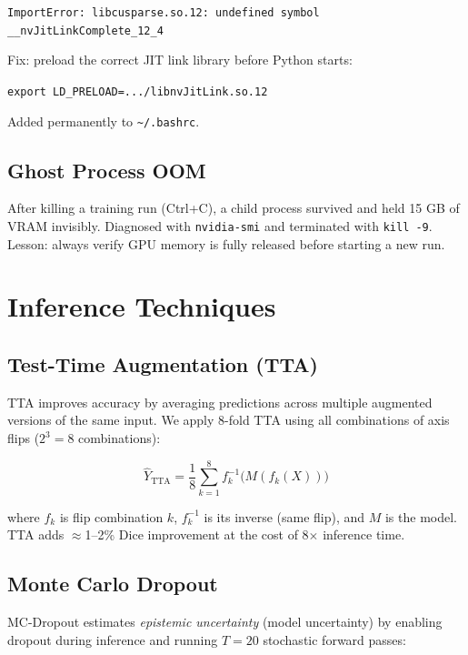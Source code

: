 \documentclass[12pt,a4paper]{article}
\newcommand{\code}[1]{\texttt{\small #1}}
\begin{document}
\begin{center}
\code{ImportError: libcusparse.so.12: undefined symbol \_\_nvJitLinkComplete\_12\_4}
\end{center}

Fix: preload the correct JIT link library before Python starts:

\begin{center}
\code{export LD\_PRELOAD=.../libnvJitLink.so.12}
\end{center}

Added permanently to \code{\textasciitilde/.bashrc}.

\subsection{Ghost Process OOM}

After killing a training run (Ctrl+C), a child process survived and held 15 GB of VRAM invisibly. Diagnosed with \code{nvidia-smi} and terminated with \code{kill -9}. Lesson: always verify GPU memory is fully released before starting a new run.

\section{Inference Techniques}

\subsection{Test-Time Augmentation (TTA)}

TTA improves accuracy by averaging predictions across multiple augmented versions of the same input. We apply 8-fold TTA using all combinations of axis flips ($2^3 = 8$ combinations):

\[
\hat{Y}_{\text{TTA}} = \frac{1}{8} \sum_{k=1}^{8} f_k^{-1}\!\bigl(M(f_k(X))\bigr)
\]

where $f_k$ is flip combination $k$, $f_k^{-1}$ is its inverse (same flip), and $M$ is the model. TTA adds $\approx$1--2\% Dice improvement at the cost of 8$\times$ inference time.

\subsection{Monte Carlo Dropout}

MC-Dropout estimates \emph{epistemic uncertainty} (model uncertainty) by enabling dropout during inference and running $T=20$ stochastic forward passes:
\end{document}

